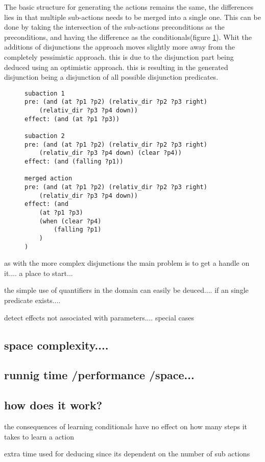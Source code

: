 	The basic structure for generating the actions remains the same, the differences lies in that multiple sub-actions needs to be merged into a single one. This can be done by taking the intersection of the sub-actions preconditions as the preconditions, and having the difference as the conditionals(figure \ref{merge}). Whit the additions of disjunctions the approach moves slightly more away from the completely pessimistic approach. this is due to the disjunction part being deduced using an optimistic approach. this is resulting in the generated disjunction being a disjunction of all possible disjunction predicates.
\begin{figure}
	\label{merge}
		\begin{lstlisting}
subaction 1
pre: (and (at ?p1 ?p2) (relativ_dir ?p2 ?p3 right) 
	(relativ_dir ?p3 ?p4 down))
effect: (and (at ?p1 ?p3))
		
subaction 2
pre: (and (at ?p1 ?p2) (relativ_dir ?p2 ?p3 right) 
	(relativ_dir ?p3 ?p4 down) (clear ?p4))
effect: (and (falling ?p1))
		
merged action
pre: (and (at ?p1 ?p2) (relativ_dir ?p2 ?p3 right) 
	(relativ_dir ?p3 ?p4 down))
effect: (and 
	(at ?p1 ?p3)
	(when (clear ?p4) 
		(falling ?p1)
	)
)
\end{lstlisting}
\end{figure}	

	
	
	as with the more complex disjunctions the main problem is to get a handle on it.... a place to start...	
	

the simple use of quantifiers in the domain can easily be deuced.... if an single predicate exists....

	detect effects not associated with parameters.... special cases 
	
\subsection{space complexity....}

	
\subsection{runnig time /performance /space...}
	
\subsection{how does it work?}	
	
	the consequences of learning conditionals have no effect on how many steps it takes to learn a action
	
	extra time used for deducing since its dependent on the number of sub actions